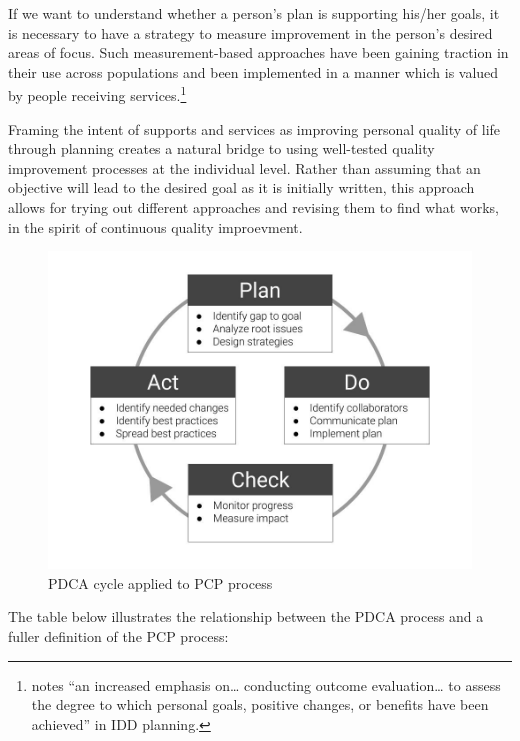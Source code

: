 \documentclass[
]{book}
\begin{document}
If we want to understand whether a person's plan is supporting his/her goals, it is necessary to have a strategy to measure improvement in the person's desired areas of focus. Such measurement-based approaches have been gaining traction in their use across populations and been implemented in a manner which is valued by people receiving services.\footnote{\citet{shalock-changes} notes ``an increased emphasis on\ldots{} conducting outcome evaluation\ldots{} to assess the degree to which personal goals, positive changes, or benefits have been achieved'' in IDD planning.}

Framing the intent of supports and services as improving personal quality of life through planning creates a natural bridge to using well-tested quality improvement processes at the individual level. Rather than assuming that an objective will lead to the desired goal as it is initially written, this approach allows for trying out different approaches and revising them to find what works, in the spirit of continuous quality improevment.

\begin{figure}
\includegraphics[width=24in]{_bookdown_files/img/pdca} \caption{PDCA cycle applied to PCP process}\label{fig:unnamed-chunk-5}
\end{figure}

The table below illustrates the relationship between the PDCA process and a fuller definition of the PCP process:
\end{document}
